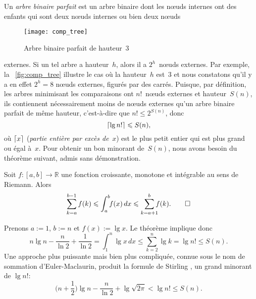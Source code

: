 %
Un \emph{arbre binaire parfait}
est un arbre binaire dont les nœuds internes ont des enfants qui
sont deux nœuds internes ou bien deux nœuds
\begin{wrapfigure}[]{r}[0pt]{0pt}
\centering
\texttt{[image: comp\_tree]}
\caption{Arbre binaire parfait de hauteur~\(3\)}
\label{fig:comp_tree}
\end{wrapfigure}
externes. Si un tel arbre a hauteur~\(h\), alors il a
\(2^h\)~nœuds externes. Par exemple, la \fig~\vref{fig:comp_tree}
illustre le cas où la hauteur~\(h\) est~\(3\) et nous constatons qu'il
y a en effet \(2^h=8\) nœuds externes, figurés par des
carrés. Puisque, par définition, les arbres minimisant les
comparaisons ont \(n!\)~nœuds externes et hauteur~\(S(n)\), ils
contiennent nécessairement moins de nœuds externes qu'un arbre
binaire parfait de même hauteur, c'est-à-dire que \(n! \leqslant
2^{S(n)}\), donc
\begin{equation*}
\lceil{\lg n!}\rceil \leqslant S(n),
\end{equation*}
où \(\lceil{x}\rceil\) (\textsl{partie entière par excès de~\(x\)})
  est le plus petit entier
qui est plus grand ou égal à~\(x\). Pour obtenir un bon minorant
de~\(S(n)\), nous avons besoin du théorème suivant, admis sans
démonstration.  \setlength{\intextsep}{12pt}
\begin{thm}
\label{thm:integral_bounds}
Soit \(f\colon [a,b] \rightarrow \mathbb{R}\) une fonction croissante,
monotone et intégrable au sens de Riemann. Alors
\begin{equation}
\abovedisplayskip=0pt
\sum_{k=a}^{b-1}f(k) \leqslant \int_{a}^{b}{\!\!f(x)} \,dx
                   \leqslant \sum_{k=a+1}^{b}{\!\!\!f(k)}.
\tag*{\(\Box\)}
\end{equation}
\end{thm}
\noindent Prenons \(a := 1\), \(b := n\) et \(f(x) := \lg x\). Le
théorème implique donc
\begin{equation*}
n\lg n - \frac{n}{\ln 2} + \frac{1}{\ln 2}
= \int_{1}^{n}{\!\!\lg x} \,dx \leqslant \sum_{k=2}^{n}{\lg k}
= \lg n! \leqslant S(n).
\end{equation*}
Une approche plus puissante mais bien plus compliquée, connue sous le
nom de sommation d'Euler-Maclaurin, produit la formule de Stirling
\citep[chap.~4]{SedgewickFlajolet_1996},
un grand minorant de \(\lg n!\):
\begin{equation}
\Big(n + \frac{1}{2}\Big)\lg n - \frac{n}{\ln 2} + \lg\sqrt{2\pi}
< \lg n! \leqslant S(n).
\label{ineq:S_lower}
\end{equation}

